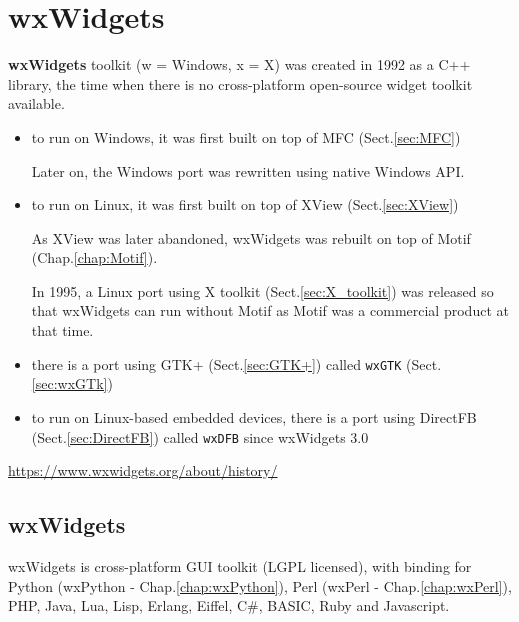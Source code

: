 \chapter{wxWidgets}
\label{chap:wxWidgets}

{\bf wxWidgets} toolkit (w = Windows, x = X) was created in 1992 as a C++
library, the time when there is no cross-platform open-source widget toolkit
available.
 
\begin{itemize}
  \item to run on Windows, it was first built on top of MFC (Sect.\ref{sec:MFC})
  
Later on, the Windows port was rewritten using native Windows API.
  
  \item to run on Linux, it was first built on top of XView (Sect.\ref{sec:XView})
  
As XView was later abandoned, wxWidgets was rebuilt on top of Motif
(Chap.\ref{chap:Motif}).

In 1995, a Linux port using X toolkit (Sect.\ref{sec:X_toolkit}) was released so
that wxWidgets can run without Motif as Motif was a commercial product at that
time.
  
  \item there is a port using GTK+ (Sect.\ref{sec:GTK+}) called \verb!wxGTK! (Sect.\ref{sec:wxGTk})
  
  \item to run on Linux-based embedded devices, there is a port using DirectFB (Sect.\ref{sec:DirectFB}) called
  \verb!wxDFB! since wxWidgets 3.0 
  
  
\end{itemize}


\url{https://www.wxwidgets.org/about/history/}

\section{wxWidgets}
\label{sec:wxWidgets}

wxWidgets is cross-platform GUI toolkit (LGPL licensed), with binding for Python
(wxPython - Chap.\ref{chap:wxPython}), Perl (wxPerl - Chap.\ref{chap:wxPerl}),
PHP, Java, Lua, Lisp, Erlang, Eiffel, C\#, BASIC, Ruby and Javascript.

